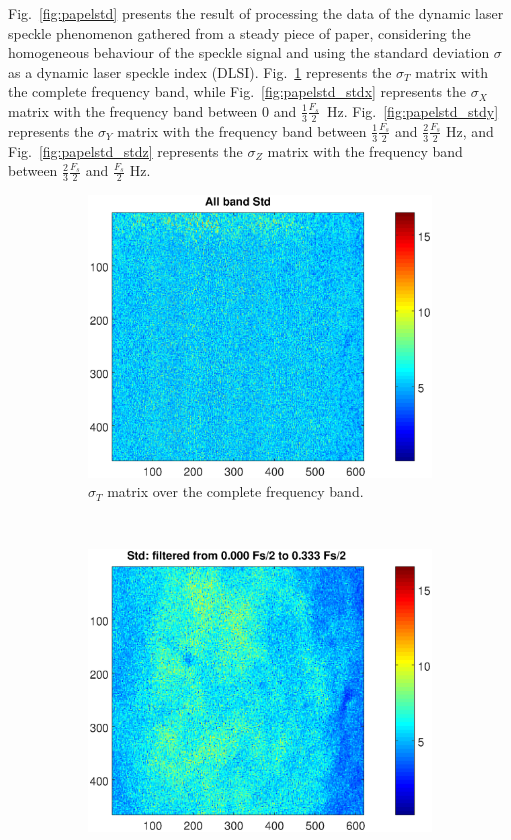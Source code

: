 \documentclass[review]{elsarticle}
\begin{document}
Fig.~\ref{fig:papelstd} presents the result of processing the data of the dynamic laser speckle phenomenon gathered from a steady
 piece of paper,
considering the homogeneous behaviour of the speckle signal and using the standard deviation $\sigma$ 
as a dynamic laser speckle index (DLSI).
Fig.~\ref{fig:papelall} represents the $\sigma_T$ matrix with the complete frequency band, while Fig.~\ref{fig:papelstd_stdx}
represents the $\sigma_X$ matrix with the frequency band between $0$ and $\frac{1}{3}\frac{F_s}{2}$\ Hz.
Fig.~\ref{fig:papelstd_stdy} represents the $\sigma_Y$ matrix with the frequency band between 
$\frac{1}{3}\frac{F_s}{2}$ and $\frac{2}{3}\frac{F_s}{2}$ Hz, and Fig.~\ref{fig:papelstd_stdz} 
represents the $\sigma_Z$ matrix with the frequency band between $\frac{2}{3}\frac{F_s}{2}$ and $\frac{F_s}{2}$ Hz.
\begin{figure}[h!]
    \centering
    \begin{subfigure}[b]{0.485\textwidth}
        \includegraphics[width=\textwidth]{stdall.eps}
	\caption{$\sigma_T$ matrix over the complete frequency band.}
        \label{fig:papelall}
    \end{subfigure}
    ~
    \begin{subfigure}[b]{0.465\textwidth}
        \includegraphics[width=\textwidth]{stdx.eps}

\end{subfigure}
\end{figure}
\end{document}
